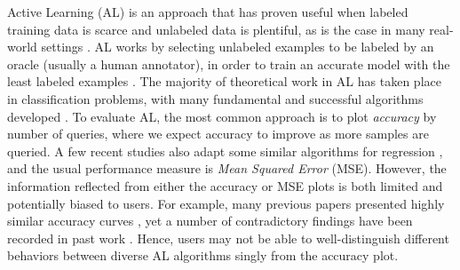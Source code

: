 \documentclass{article}
\begin{document}
Active Learning (AL) is an approach that has proven useful when labeled training data is scarce and unlabeled data is plentiful, as is the case in many real-world settings \citep{multicriteria}. AL works by selecting unlabeled examples to be labeled by an oracle (usually a human annotator), in order to train an accurate model with the least labeled examples \citep{Settles}. The majority of theoretical work in AL has taken place in classification problems, with many fundamental and successful algorithms developed \citep{uncertainty, Abe1998QueryLS}. To evaluate AL, the most common approach is to plot \textit{accuracy} by number of queries, where we expect accuracy to improve as more samples are queried. A few recent studies also adapt some similar algorithms for regression \citep{NEURIPS2018_dc4c44f6, WU201990}, and the usual performance measure is \textit{Mean Squared Error} (MSE). However, the information reflected from either the accuracy or MSE plots is both limited and potentially biased to users. For example, many previous papers presented highly similar accuracy curves \citep{zhan2021multiplecriteria,beck2021effective,ash2020deep}, yet a number of contradictory findings have been recorded in past work \citep{beck2021effective}. Hence, users may not be able to well-distinguish different behaviors between diverse AL algorithms singly from the accuracy plot.



\end{document}
